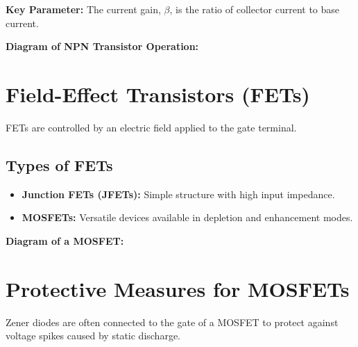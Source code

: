 \textbf{Key Parameter:} The current gain, $\beta$, is the ratio of collector current to base current.

\textbf{Diagram of NPN Transistor Operation:}

\begin{center}
\end{center}

\section*{Field-Effect Transistors (FETs)}
FETs are controlled by an electric field applied to the gate terminal.

\subsection*{Types of FETs}
\begin{itemize}
    \item \textbf{Junction FETs (JFETs):} Simple structure with high input impedance.
    \item \textbf{MOSFETs:} Versatile devices available in depletion and enhancement modes.
\end{itemize}

\textbf{Diagram of a MOSFET:}

\begin{center}
\end{center}

\section*{Protective Measures for MOSFETs}
Zener diodes are often connected to the gate of a MOSFET to protect against voltage spikes caused by static discharge.

